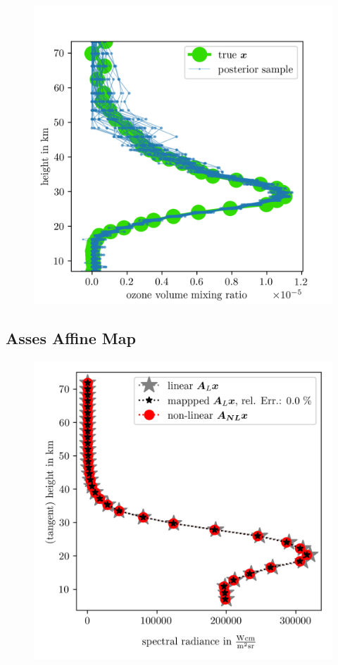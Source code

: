 \begin{figure}[ht!]
	\centering
	\includegraphics{FirstTestRes.png}
	\caption[]{}
	\label{fig:}
\end{figure}


\subsection{Asses Affine Map}
\begin{figure}[ht!]
	\centering
	\includegraphics{SampMapAssesment.png}
	\caption[]{}
	\label{fig:}
\end{figure}
